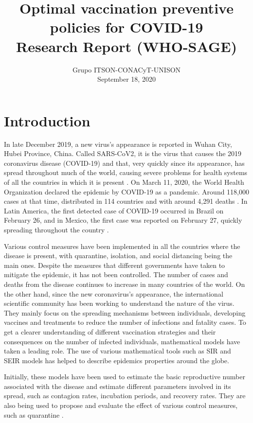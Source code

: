 \documentclass[preprint, sort&compress]{elsarticle}
\begin{document}
    \begin{frontmatter}
        \title{
            Optimal vaccination preventive policies for COVID-19\\
            \large{Research Report (WHO-SAGE)}
        }
        \author{Grupo ITSON-CONACyT-UNISON\\
            September 18, 2020
        }

\end{frontmatter}

	\section{Introduction}
		In late December 2019, a new virus's appearance is reported in Wuhan City, Hubei Province, China. Called SARS-CoV2, it is the virus that causes the 2019 coronavirus disease (COVID-19) and that, very quickly since its appearance, has spread throughout much of the world, causing severe problems for health systems of all the countries in which it is present \cite{Who12020}. On March 11, 2020, the World Health Organization declared the epidemic by COVID-19 as a pandemic.  Around 118,000 cases at that time, distributed in 114 countries and with around 4,291 deaths \cite{Who512020}. In Latin America, the first
detected case of COVID-19 occurred in Brazil on February 26, and in Mexico, the first case was reported on February 27, quickly spreading throughout the country \cite{Ajrm2020,Acuna2020}.

Various control measures have been implemented in all the countries where the disease is present, with quarantine, isolation, and social distancing being the main ones. Despite the measures that different governments have taken to mitigate the epidemic, it has not been controlled. The number of cases and deaths from the disease continues to increase in many countries of the world. On the other hand, since the new coronavirus's appearance, the international scientific community has been working to understand the nature of the virus. They mainly focus on the spreading mechanisms between individuals, developing vaccines and treatments to reduce the number of infections and fatality cases. To get a clearer understanding of different vaccination strategies and their consequences on the number of infected individuals, mathematical models have taken a leading role. The use of various mathematical tools such as SIR and SEIR models has helped to describe epidemics properties around the globe.

Initially, these models have been used to estimate the basic reproductive number associated with the disease and estimate different parameters involved in its spread, such as contagion rates, incubation periods, and recovery rates. They are also being used to propose and evaluate the effect of various control measures, such as quarantine \cite{Acuna2020,Wang2020,Marimuthu2020,Liu2020,Ghosh2020,Calvetti2020,Shaikh2020}.
\end{document}
